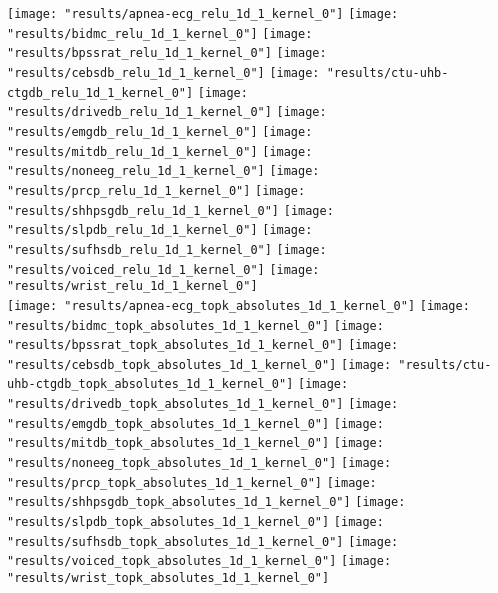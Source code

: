 \documentclass[journal]{IEEEtran}
\begin{document}
\begin{figure*}[!t]
	\centering
	\texttt{[image: "results/apnea-ecg\_relu\_1d\_1\_kernel\_0"]}
	\texttt{[image: "results/bidmc\_relu\_1d\_1\_kernel\_0"]}
	\texttt{[image: "results/bpssrat\_relu\_1d\_1\_kernel\_0"]}
	\texttt{[image: "results/cebsdb\_relu\_1d\_1\_kernel\_0"]}
	\texttt{[image: "results/ctu-uhb-ctgdb\_relu\_1d\_1\_kernel\_0"]}
	\texttt{[image: "results/drivedb\_relu\_1d\_1\_kernel\_0"]}
	\texttt{[image: "results/emgdb\_relu\_1d\_1\_kernel\_0"]}
	\texttt{[image: "results/mitdb\_relu\_1d\_1\_kernel\_0"]}
	\texttt{[image: "results/noneeg\_relu\_1d\_1\_kernel\_0"]}
	\texttt{[image: "results/prcp\_relu\_1d\_1\_kernel\_0"]}
	\texttt{[image: "results/shhpsgdb\_relu\_1d\_1\_kernel\_0"]}
	\texttt{[image: "results/slpdb\_relu\_1d\_1\_kernel\_0"]}
	\texttt{[image: "results/sufhsdb\_relu\_1d\_1\_kernel\_0"]}
	\texttt{[image: "results/voiced\_relu\_1d\_1\_kernel\_0"]}
	\texttt{[image: "results/wrist\_relu\_1d\_1\_kernel\_0"]}
	\\
	\texttt{[image: "results/apnea-ecg\_topk\_absolutes\_1d\_1\_kernel\_0"]}
	\texttt{[image: "results/bidmc\_topk\_absolutes\_1d\_1\_kernel\_0"]}
	\texttt{[image: "results/bpssrat\_topk\_absolutes\_1d\_1\_kernel\_0"]}
	\texttt{[image: "results/cebsdb\_topk\_absolutes\_1d\_1\_kernel\_0"]}
	\texttt{[image: "results/ctu-uhb-ctgdb\_topk\_absolutes\_1d\_1\_kernel\_0"]}
	\texttt{[image: "results/drivedb\_topk\_absolutes\_1d\_1\_kernel\_0"]}
	\texttt{[image: "results/emgdb\_topk\_absolutes\_1d\_1\_kernel\_0"]}
	\texttt{[image: "results/mitdb\_topk\_absolutes\_1d\_1\_kernel\_0"]}
	\texttt{[image: "results/noneeg\_topk\_absolutes\_1d\_1\_kernel\_0"]}
	\texttt{[image: "results/prcp\_topk\_absolutes\_1d\_1\_kernel\_0"]}
	\texttt{[image: "results/shhpsgdb\_topk\_absolutes\_1d\_1\_kernel\_0"]}
	\texttt{[image: "results/slpdb\_topk\_absolutes\_1d\_1\_kernel\_0"]}
	\texttt{[image: "results/sufhsdb\_topk\_absolutes\_1d\_1\_kernel\_0"]}
	\texttt{[image: "results/voiced\_topk\_absolutes\_1d\_1\_kernel\_0"]}
	\texttt{[image: "results/wrist\_topk\_absolutes\_1d\_1\_kernel\_0"]}
	\\

\end{figure*}
\end{document}
